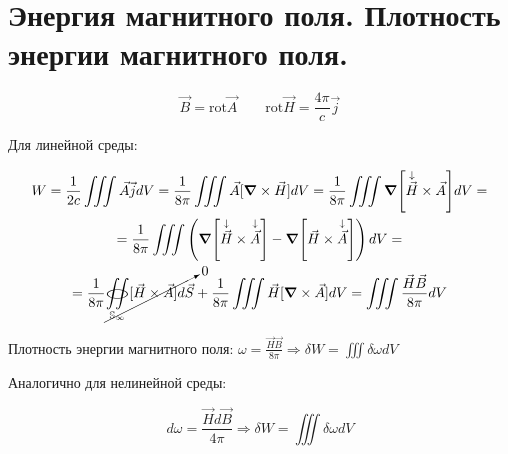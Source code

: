\section{Энергия магнитного поля. Плотность энергии магнитного поля.}

\[
\vec{B}=\mathrm{rot}\vec{A} \qquad \mathrm{rot}\vec{H}=\frac{4\pi}{c}\vec{j}
\]

Для линейной среды:

\begin{gather*}
    W=\frac{1}{2c}\iiint \vec{A}\vec{j}dV=\frac{1}{8\pi}\iiint \vec{A}[\grad \times \vec{H}]dV=\frac{1}{8\pi}\iiint \grad[\overset{\downarrow}{\vec{H}}\times \vec{A}]dV= \\
    =\frac{1}{8\pi}\iiint \left( \grad[\overset{\downarrow}{\vec{H}}\times \overset{\downarrow}{\vec{A}}]-\grad [\vec{H}\times \overset{\downarrow}{\vec{A}}] \right)dV= \\
    =\frac{1}{8\pi} \cancelto{0}{\underset{\mathbb{S}_{\infty }}{\oiint}[\vec{H}\times \vec{A}]d\vec{S} }+\frac{1}{8\pi}\iiint\vec{H}[\grad \times \vec{A}]dV=\iiint \frac{\vec{H}\vec{B}}{8\pi}dV  
\end{gather*}

Плотность энергии магнитного поля: \( \omega= \frac{\vec{H}\vec{B}}{8\pi} \Rightarrow \delta W= \iiint \delta\omega dV \)

Аналогично для нелинейной среды:

\[
d\omega= \frac{\vec{H}d\vec{B}}{4\pi} \Rightarrow \delta W = \iiint \delta \omega dV
\]